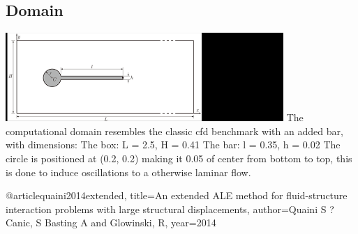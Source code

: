 \subsection*{Domain}
\includegraphics[scale=0.9]{geometry.png}
The computational domain resembles the classic cfd benchmark with an added bar, with dimensions:
The box: L = 2.5, H = 0.41
The bar: l = 0.35, h = 0.02
The circle is positioned at (0.2, 0.2) making it 0.05 of center from bottom to top, this is done to induce oscillations to a otherwise laminar flow.





@article{quaini2014extended,
  title={An extended ALE method for fluid-structure interaction problems with large structural displacements},
  author={Quaini S ?Canic, S Basting A and Glowinski, R},
  year={2014}
}



